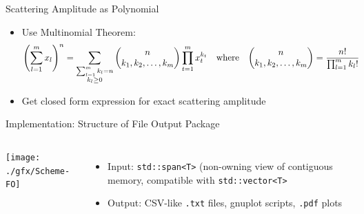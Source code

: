 \begin{frame}{Scattering Amplitude as Polynomial}
%
\begin{itemize}
\item Use Multinomial Theorem:
	\begin{align*}
		\qty(
			\sum_{l=1}^{m} x_l
		)^{n}
	&=
		\sum_{\substack{\sum_{l=1}^m k_l = n \\ k_l \geq 0}}
		\begin{pmatrix}
			n \\ k_1, k_2, \ldots, k_m
		\end{pmatrix}
		\prod_{t=1}^{m}
			x_t^{k_t}
	&
	\text{where}
	&&
		\begin{pmatrix}
			n \\ k_1, k_2, \ldots, k_m
		\end{pmatrix}
	&=
		\frac{n!}
		{\prod_{l=1}^m k_l !}
	\end{align*}
\item Get closed form expression for exact scattering amplitude
\end{itemize}
%
\end{frame}


\begin{frame}{Implementation: Structure of File Output Package}
%
\begin{columns}[t]
\begin{center}
	\texttt{[image: ./gfx/Scheme-FO]}
\end{center}
%
\begin{itemize}
\item Input: \texttt{std::span<T>} (non-owning view of contiguous memory, compatible with \texttt{std::vector<T>}
\item Output: CSV-like \texttt{.txt} files, gnuplot scripts, \texttt{.pdf} plots
\end{itemize}
\end{columns}
%
\end{frame}
\setcounter{framenumber}{31}